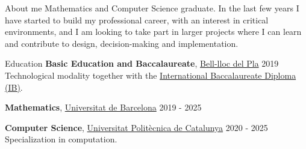 \documentclass{resume} %
\begin{document}
\begin{rSection}{About me}
  Mathematics and Computer Science graduate. In the last few years I have
  started to build my professional career, with an interest in critical
  environments, and I am looking to take part in larger projects where I
  can learn and contribute to design, decision-making and implementation.
\end{rSection}

\begin{rSection}{Education}
  {\bf Basic Education and Baccalaureate},
  \href{https://www.bell-lloc.org/en/}{Bell-lloc del Pla} \hfill {2019}\\
  Technological modality together with the
  \href{https://www.ibo.org/}{International Baccalaureate Diploma (IB)}.

  {\bf Mathematics}, \href{https://web.ub.edu/en/home}{Universitat de
  Barcelona} \hfill {2019 - 2025}

  {\bf Computer Science},
  \href{https://www.upc.edu/en?set_language=en}{Universitat Politècnica
  de Catalunya} \hfill {2020 - 2025}\\
  Specialization in computation.
\end{rSection}
\end{document}

